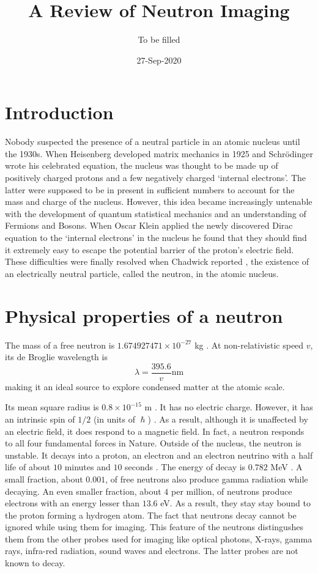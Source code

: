 \documentclass{article}
\title{A Review of Neutron Imaging}
\author{To be filled}
\date{27-Sep-2020}
\numberwithin{equation}{section}
\begin{document}
\maketitle
\section{Introduction}\label{s1}
Nobody suspected the presence of a neutral particle in an atomic nucleus until
the 1930s. When Heisenberg developed matrix mechanics in 1925 and 
Schr\"{o}dinger wrote his celebrated equation, the nucleus was thought to be
made up of positively charged protons and a few negatively charged `internal
electrons'. The latter were supposed to be in present in sufficient numbers to
account for the mass and charge of the nucleus. However, this idea became
increasingly untenable with the development of quantum statistical mechanics
and an understanding of Fermions and Bosons. When Oscar Klein 
\cite{klein1929reflexion} applied the newly discovered Dirac equation to the
`internal electrons' in the nucleus he found that they should find it 
extremely easy to escape the potential barrier of the proton's electric field.
These difficulties were finally resolved when Chadwick reported 
\cite{chadwick1932existence}, the existence of an electrically neutral particle, called the neutron, in the atomic nucleus. 

\section{Physical properties of a neutron}\label{s2}
The mass of a free neutron is $1.674927471 \times 10^{-27}$ kg
\cite{taylor2007nist}. At non-relativistic speed $v$, its de Broglie wavelength
is \cite{anderson2008neutron}
\begin{equation}\label{s2e1}
\lambda = \frac{395.6}{v} \text{nm}
\end{equation}
making it an ideal source to explore condensed matter at the atomic scale.

Its mean square radius is $0.8 \times 10^{-15}$ m
\cite{bogdan2015particles}. It has no electric charge. However, it has
an intrinsic spin of $1/2$ (in units of $\hslash$)
\cite{basdevant2005fundamentals}. As a result, although it is unaffected by 
an electric field, it does respond to a magnetic field. In fact, a neutron 
responds to all four fundamental forces in Nature. Outside of
the nucleus, the neutron is unstable. It decays into a proton, an electron and
an electron neutrino with a half life of about $10$ minutes and $10$ seconds
\cite{Nakamura_2010}. The energy of decay is $0.782$ MeV \cite{heyde2004basic}.
A small fraction, about $0.001$, of free neutrons also produce gamma radiation 
while decaying. An even smaller fraction, about $4$ per million, of neutrons
produce electrons with an energy lesser than $13.6$ eV. As a result, they
stay stay bound to the proton forming a hydrogen atom. The fact that neutrons
decay cannot be ignored while using them for imaging. This feature of the
neutrons distingushes them from the other probes used for imaging like optical
photons, X-rays, gamma rays, infra-red radiation, sound waves and electrons. 
The latter probes are not known to decay.
\end{document}

